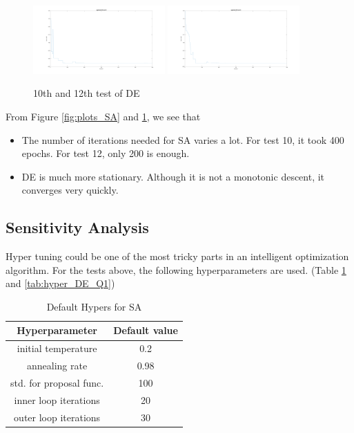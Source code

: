 \documentclass{IEEEtran}
\begin{document}
{{{            \begin{figure}[!htbp]
                \centering
                \includegraphics[width=0.45\textwidth]{Q1/figures/eggholder_DE_test_10.png}
                \includegraphics[width=0.45\textwidth]{Q1/figures/eggholder_DE_test_12.png}
                \caption{10th and 12th test of DE}
                \label{fig:plots_DE}
            \end{figure}

            From Figure \ref{fig:plots_SA} and \ref{fig:plots_DE}, we see that
            \begin{itemize}
                \item The number of iterations needed for SA varies a lot. For test 10, it took 400 epochs. For test 12, only 200 is enough.
                \item DE is much more stationary. Although it is not a monotonic descent, it converges very quickly.
            \end{itemize}
        }
    }

    \subsection{Sensitivity Analysis}
    {
        Hyper tuning could be one of the most tricky parts in an intelligent optimization algorithm. 
        For the tests above, the following hyperparameters are used. (Table \ref{tab:hyper_SA_Q1} and \ref{tab:hyper_DE_Q1})

        \begin{table}[!hbp]
            \centering
            \begin{tabular}{|c|c|}
                \hline
                Hyperparameter & Default value \\
                \hline
                initial temperature & 0.2 \\
                \hline
                annealing rate & 0.98 \\
                \hline
                std. for proposal func. & 100 \\
                \hline
                inner loop iterations & 20 \\
                \hline
                outer loop iterations & 30 \\
                \hline
            \end{tabular}
            \caption{Default Hypers for SA}
            \label{tab:hyper_SA_Q1}
        \end{table}

}}
\end{document}
